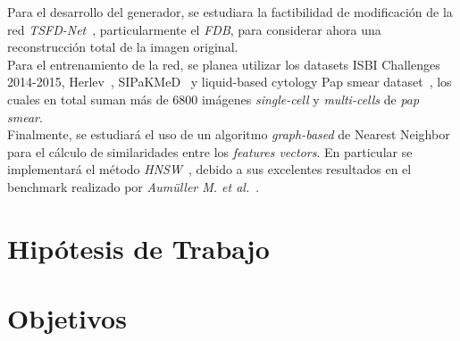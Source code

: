 \documentclass[10pt]{article}
\begin{document}
Para el desarrollo del generador, se estudiara la factibilidad de modificación de la red \textit{TSFD-Net}~\cite{Ilyas2022}, particularmente el \textit{FDB}, para considerar ahora una reconstrucción total de la imagen original.\\

Para el entrenamiento de la red, se planea utilizar los datasets ISBI Challenges 2014-2015\cite{7005499}\cite{Lu2017},  Herlev~\cite{Marinakis2009}\cite{Dounias2006AutomatedIO}\cite{asljkhdjaskdj}\cite{86c7f5c1a9f84a7484731dd71671c563}, SIPaKMeD~\cite{8451588} y  liquid-based cytology Pap smear dataset~\cite{Hussain2020}, los cuales en total suman más de 6800 imágenes \textit{single-cell} y \textit{multi-cells} de \textit{pap smear}.\\

Finalmente, se estudiará el uso de un algoritmo \textit{graph-based} de Nearest Neighbor para el cálculo de similaridades entre los \textit{features vectors}. En particular se implementará el método \textit{HNSW}~\cite{Malkov2016EfficientAR, Boytsov2013EngineeringEA}, debido a sus excelentes resultados en el benchmark realizado por \textit{Aumüller M. et al.}~\cite{10.48550/arxiv.1807.05614}.

\newpage
\section[]{Hipótesis de Trabajo}




\newpage
\section[]{Objetivos}%
\end{document}
